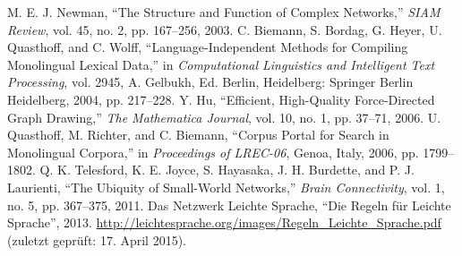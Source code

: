 \documentclass[11pt, a4paper]{article}
\begin{document}
\newpage
\begin{thebibliography}{9}
     M. E. J. Newman, “The Structure and Function of Complex Networks,” \emph{SIAM Review}, vol. 45, no. 2, pp. 167–256, 2003.
     C. Biemann, S. Bordag, G. Heyer, U. Quasthoff, and C. Wolff, “Language-Independent Methods for Compiling Monolingual Lexical Data,” in \emph{Computational Linguistics and Intelligent Text Processing}, vol. 2945, A. Gelbukh, Ed. Berlin, Heidelberg: Springer Berlin Heidelberg, 2004, pp. 217–228.
     Y. Hu, “Efficient, High-Quality Force-Directed Graph Drawing,” \emph{The Mathematica Journal}, vol. 10, no. 1, pp. 37–71, 2006.
    U. Quasthoff, M. Richter, and C. Biemann, “Corpus Portal for Search in Monolingual Corpora,” in \emph{Proceedings of LREC-06}, Genoa, Italy, 2006, pp. 1799–1802.
    Q. K. Telesford, K. E. Joyce, S. Hayasaka, J. H. Burdette, and P. J. Laurienti, “The Ubiquity of Small-World Networks,” \emph{Brain Connectivity}, vol. 1, no. 5, pp. 367–375, 2011.
     Das Netzwerk Leichte Sprache, “Die Regeln für Leichte Sprache”, 2013. \url{http://leichtesprache.org/images/Regeln_Leichte_Sprache.pdf} (zuletzt geprüft: 17. April 2015).
\end{thebibliography}

\listoftables

\listoffigures
\end{document}
